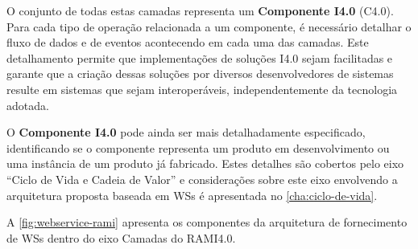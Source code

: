 	
	O conjunto de todas estas camadas representa um \textbf{Componente I4.0} (C4.0). Para cada tipo de operação relacionada a um componente, é necessário detalhar o fluxo de dados e de eventos acontecendo em cada uma das camadas. Este detalhamento permite que implementações de soluções I4.0 sejam facilitadas e garante que a criação dessas soluções por diversos desenvolvedores de sistemas resulte em sistemas que sejam interoperáveis, independentemente da tecnologia adotada.
	
	O \textbf{Componente I4.0} pode ainda ser mais detalhadamente especificado, identificando se o componente representa um produto em desenvolvimento ou uma instância de um produto já fabricado. Estes detalhes são cobertos pelo eixo ``Ciclo de Vida e Cadeia de Valor'' e considerações sobre este eixo envolvendo a arquitetura proposta baseada em WSs é apresentada no \autoref{cha:ciclo-de-vida}.
	
	A \autoref{fig:webservice-rami} apresenta os componentes da arquitetura de fornecimento de WSs dentro do eixo Camadas do RAMI4.0.%
	
	
